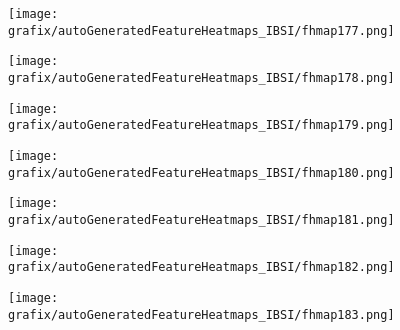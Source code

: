 \hspace{\hsp} 
\begin{subfigure}{\wid\textwidth} 
    \centering 
    \caption{\tiny \sffamily {}} 
    \vspace{\vsp} 
    \texttt{[image: grafix/autoGeneratedFeatureHeatmaps\_IBSI/fhmap177.png]} 
\end{subfigure} 
\hspace{\hsp} 
\begin{subfigure}{\wid\textwidth} 
    \centering 
    \caption{\tiny \sffamily {}} 
    \vspace{\vsp} 
    \texttt{[image: grafix/autoGeneratedFeatureHeatmaps\_IBSI/fhmap178.png]} 
\end{subfigure} 
\hspace{\hsp} 
\begin{subfigure}{\wid\textwidth} 
    \centering 
    \caption{\tiny \sffamily {}} 
    \vspace{\vsp} 
    \texttt{[image: grafix/autoGeneratedFeatureHeatmaps\_IBSI/fhmap179.png]} 
\end{subfigure} 
\hspace{\hsp} 
\begin{subfigure}{\wid\textwidth} 
    \centering 
    \caption{\tiny \sffamily {}} 
    \vspace{\vsp} 
    \texttt{[image: grafix/autoGeneratedFeatureHeatmaps\_IBSI/fhmap180.png]} 
\end{subfigure} 
\hspace{\hsp} 
\begin{subfigure}{\wid\textwidth} 
    \centering 
    \caption{\tiny \sffamily {}} 
    \vspace{\vsp} 
    \texttt{[image: grafix/autoGeneratedFeatureHeatmaps\_IBSI/fhmap181.png]} 
\end{subfigure} 
\hspace{\hsp} 
\begin{subfigure}{\wid\textwidth} 
    \centering 
    \caption{\tiny \sffamily {}} 
    \vspace{\vsp} 
    \texttt{[image: grafix/autoGeneratedFeatureHeatmaps\_IBSI/fhmap182.png]} 
\end{subfigure} 
\hspace{\hsp} 
\begin{subfigure}{\wid\textwidth} 
    \centering 
    \caption{\tiny \sffamily {}} 
    \vspace{\vsp} 
    \texttt{[image: grafix/autoGeneratedFeatureHeatmaps\_IBSI/fhmap183.png]} 
\end{subfigure} 
